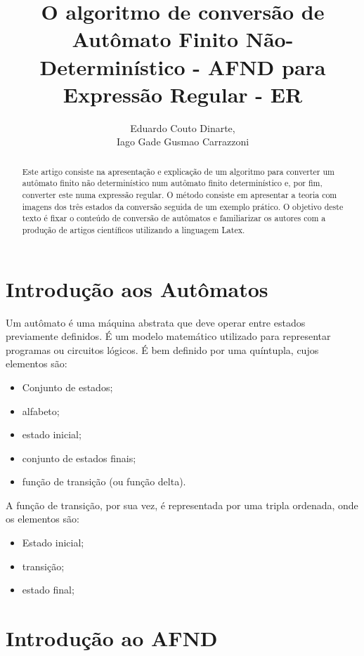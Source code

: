 \documentclass[a4paper,10pt]{article} %
\title{O algoritmo de conversão de Autômato Finito Não-Determinístico - AFND para Expressão Regular - ER}
\author{Eduardo Couto Dinarte,\\ Iago Gade Gusmao Carrazzoni}
\begin{document}
\maketitle

\begin{abstract}

    Este artigo consiste na apresenta\c{c}\~{a}o e explica\c{c}\~{a}o de um algoritmo para converter um aut\^{o}mato finito n\~{a}o determin\'{i}stico num aut\^{o}mato finito determin\'{i}stico e, por fim, converter este numa express\~{a}o regular. O m\'{e}todo consiste em apresentar a teoria com imagens dos tr\^{e}s estados da convers\~{a}o seguida de um exemplo pr\'{a}tico. O objetivo deste texto \'{e} fixar o conte\'{u}do de convers\~{a}o de aut\^{o}matos e familiarizar os autores com a produ\c{c}\~{a}o de artigos cient\'{i}ficos utilizando a linguagem Latex.

\end{abstract}


\section{Introdução aos Autômatos}

    Um autômato é uma máquina abstrata que deve operar entre estados previamente definidos. É um modelo matemático utilizado para representar programas ou circuitos lógicos. É bem definido por uma quíntupla, cujos elementos são:
    \begin{itemize}
        \item Conjunto de estados;
        \item alfabeto;
        \item estado inicial;
        \item conjunto de estados finais;
        \item função de transição (ou função delta).
    \end{itemize}

A função de transição, por sua vez, é representada por uma tripla ordenada, onde os elementos são:
    \begin{itemize}
        \item Estado inicial;
        \item transição;
        \item estado final;
    \end{itemize}

\section{Introdução ao AFND}
\end{document}
